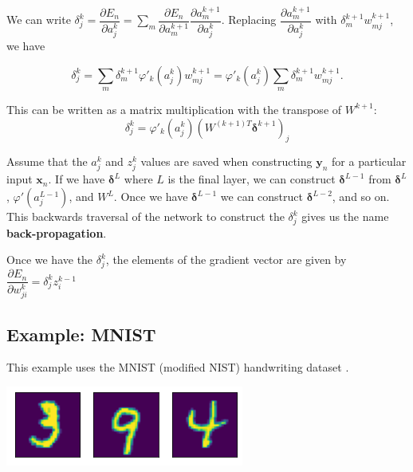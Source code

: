 \documentclass[12pt,letterpaper,noanswers]{exam}
\newcommand{\vc}[1]{\boldsymbol{#1}}
\newcommand{\note}[1]{{#1}} %
\begin{document}
\note{\begin{tcolorbox}
We can write $\displaystyle\delta_j^k=\dfrac{\partial E_n}{\partial a_j^k}  = \sum\limits_m \dfrac{\partial E_n}{\partial a_m^{k+1}}\dfrac{\partial a_m^{k+1}}{\partial a_j^k}$.  Replacing $\dfrac{\partial a_m^{k+1}}{\partial a_j^k}$ with $\delta_m^{k+1}w^{k+1}_{mj}$, we have

\[\displaystyle\delta_j^k= \sum\limits_m \delta^{k+1}_m \varphi'_k(a_j^k)w^{k+1}_{mj} = \varphi'_k(a_j^k)\sum\limits_m \delta^{k+1}_m w^{k+1}_{mj}.\]

This can be written as a matrix multiplication with the transpose of $W^{k+1}$: \[\delta_j^k = \varphi'_k(a_j^k)(W^{(k+1)T}\vc{\delta}^{k+1})_j\]

Assume that the $a_j^k$ and $z_j^k$ values are saved when constructing $\vc{y}_n$ for a particular input $\vc{x}_n$.  If we have $\vc{\delta}^L$ where $L$ is the final layer, we can construct $\vc{\delta}^{L-1}$ from $\vc{\delta}^L$, $\varphi'(a_j^{L-1})$, and $W^{L}$.  Once we have $\vc{\delta}^{L-1}$ we can construct $\vc{\delta}^{L-2}$, and so on.  This backwards traversal of the network to construct the $\delta_j^k$ gives us the name \textbf{back-propagation}.

Once we have the $\delta_j^k$, the elements of the gradient vector are given by $\dfrac{\partial E_n}{\partial w_{ji}^k} = \delta_j^k z_i^{k-1}$
\end{tcolorbox}}


\subsection*{Example: MNIST}

This example uses the MNIST (modified NIST) handwriting dataset \cite{lecun1998gradient}.

\includegraphics{img/C23mnist.png}
\end{document}
